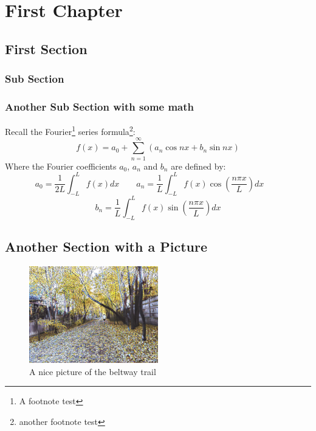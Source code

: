 \documentclass[11pt,letterpaper,twoside]{book}
\begin{document}
\setlength{\parskip}{1.1ex}
\tableofcontents
\setlength{\parskip}{2.5ex}

\chapter{First Chapter}

\lipsum[1-2]

\section{First Section}

\lipsum[3-5]

\subsection{Sub Section}

\lipsum[7-9]

\subsection{Another Sub Section with some math}

\lipsum[6-8]
Recall the Fourier\footnote{A footnote test} series formula\footnote{another footnote test \lipsum[1]}:
\[
f(x) = a_0 + \sum_{n = 1}^\infty \left( a_n \cos nx + b_n \sin nx \right)
\]
Where the Fourier coefficients $a_0$, $a_n$ and $b_n$ are defined by:
\[
a_0 = \frac{1}{2L} \int_{-L}^L f(x) dx  \qquad
a_n = \frac{1}{L}  \int_{-L}^L f(x) \cos \left( \frac{n\pi x}{L} \right) dx \qquad
\]
\[
b_n = \frac{1}{L}  \int_{-L}^L f(x) \sin \left( \frac{n\pi x}{L} \right) dx 
\]
\lipsum[33-34]

\section{Another Section with a Picture}

\lipsum[9]
\begin{figure}
\centering
\includegraphics[width=0.5\textwidth]{TrailPic1}
\caption{\label{fig:path}A nice picture of the beltway trail}
\end{figure}
\end{document}
